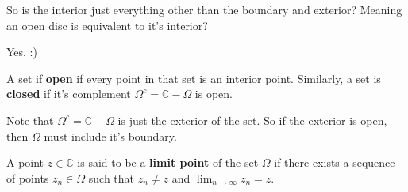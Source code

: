 \documentclass[12pt]{article}
\begin{document}
\begin{aq}
  So is the interior just everything other than the boundary and exterior? Meaning an open disc is equivalent to
  it's interior?
\end{aq}
\begin{answer}
  Yes. :)
\end{answer}

\begin{definition}
  A set if \textbf{open} if every point in that set is an interior point. Similarly, a set is \textbf{closed} 
  if it's complement $\Omega^c = \mathbb{C} - \Omega$ is open.
\end{definition}

Note that $\Omega^c = \mathbb{C} - \Omega$ is just the exterior of the set. So if the exterior is open, then 
$\Omega$ must include it's boundary.

\begin{definition}
  A point $z \in \mathbb{C}$ is said to be a \textbf{limit point} of the set $\Omega$ if there exists a sequence 
  of points $z_n \in \Omega$ such that $z_n \neq z$ and $\lim_{n \to \infty} z_n = z$. 
\end{definition}
\end{document}
